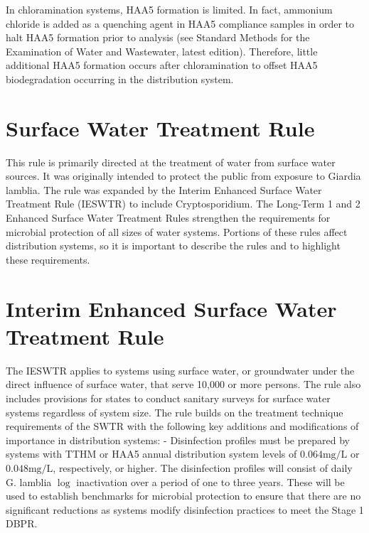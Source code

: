 \documentclass[10pt]{article}
\begin{document}
In chloramination systems, HAA5 formation is limited. In fact, ammonium chloride is added as a quenching agent in HAA5 compliance samples in order to halt HAA5 formation prior to analysis (see Standard Methods for the Examination of Water and Wastewater, latest edition). Therefore, little additional HAA5 formation occurs after chloramination to offset HAA5 biodegradation occurring in the distribution system.

\section{Surface Water Treatment Rule}
This rule is primarily directed at the treatment of water from surface water sources. It was originally intended to protect the public from exposure to Giardia lamblia. The rule was expanded by the Interim Enhanced Surface Water Treatment Rule (IESWTR) to include Cryptosporidium. The Long-Term 1 and 2 Enhanced Surface Water Treatment Rules strengthen the requirements for microbial protection of all sizes of water systems. Portions of these rules affect distribution systems, so it is important to describe the rules and to highlight these requirements.

\section{Interim Enhanced Surface Water Treatment Rule}
The IESWTR applies to systems using surface water, or groundwater under the direct influence of surface water, that serve 10,000 or more persons. The rule also includes provisions for states to conduct sanitary surveys for surface water systems regardless of system size. The rule builds on the treatment technique requirements of the SWTR with the following key additions and modifications of importance in distribution systems: - Disinfection profiles must be prepared by systems with TTHM or HAA5 annual distribution system levels of $0.064 \mathrm{mg} / \mathrm{L}$ or $0.048 \mathrm{mg} / \mathrm{L}$, respectively, or higher. The disinfection profiles will consist of daily G. lamblia $\log$ inactivation over a period of one to three years. These will be used to establish benchmarks for microbial protection to ensure that there are no significant reductions as systems modify disinfection practices to meet the Stage 1 DBPR.
\end{document}
